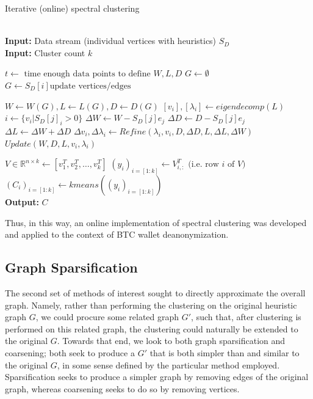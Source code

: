\documentclass{article}
\begin{document}
\begin{algorithm}
\caption{Iterative (online) spectral clustering \cite{incremental}}\label{alg:spectral-iterative}
\begin{algorithmic}[1]
 \\
\textbf{Input:} Data stream (individual vertices with heuristics) $S_D$ \\
\textbf{Input:} Cluster count $k$

\State $t \gets\text{ time enough data points to define } W, L, D$
\State $G \gets \emptyset$
    \State $G \gets S_D[i] \text{update vertices/edges}$
\EndFor

\State $W\gets W(G), L\gets L(G), D\gets D(G)$
\State $[v_i], [\lambda_i] \gets eigendecomp(L)$
    \State $i \gets \{v_i|S_D[j]_i > 0\}$
    \State $\Delta W\gets W - S_D[j] e_j$
    \State $\Delta D\gets D - S_D[j] e_j$
    \State $\Delta L\gets \Delta W + \Delta D$
    \State $\Delta v_i, \Delta \lambda_i \gets Refine(\lambda_i, v_i, D, \Delta D, L, \Delta L, \Delta W)$
    \State $Update(W,D,L,v_i,\lambda_i)$
\EndWhile

\State $V\in\mathbb{R}^{n\times k} \gets [v_1^T, v_2^T,\dots,v_k^T]$
\State $(y_i)_{i=[1:k]} \gets V^T_{i,:} \text{ (i.e. row } i \text{ of } V\text{)}$
\State $(C_i)_{i=[1:k]} \gets kmeans((y_i)_{i=[1:k]})$ \\

\textbf{Output:} $C$
\EndProcedure
\end{algorithmic}
\end{algorithm}

Thus, in this way, an online implementation of spectral clustering was developed and applied to the context of BTC wallet deanonymization.

\subsection{Graph Sparsification}\label{sparsification-bg}
The second set of methods of interest sought to directly approximate the overall graph. Namely, rather than performing the clustering on the original heuristic graph $G$, we could procure some related graph $G'$, such that, after clustering is performed on this related graph, the clustering could naturally be extended to the original $G$. Towards that end, we look to both graph sparsification and coarsening; both seek to produce a $G'$ that is both simpler than and similar to the original $G$, in some sense defined by the particular method employed. Sparsification seeks to produce a simpler graph by removing edges of the original graph, whereas coarsening seeks to do so by removing vertices.
\end{document}
